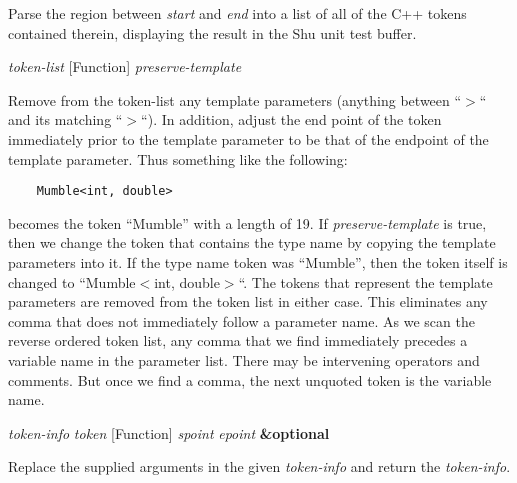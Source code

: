 \begin{doc-string}
Parse the region between \emph{start} and \emph{end} into a list of all of the C++ tokens
contained therein, displaying the result in the Shu unit test buffer.
\end{doc-string}

\vspace{1em}
\noindent
{}
\usebox{\funcname}\emph{token-list}
 \hfill [Function]
\hspace*{\wd\funcname}\emph{preserve-template}

\begin{doc-string}
Remove from the token-list any template parameters (anything between ``$>$``
and its matching ``$>$``).  In addition, adjust the end point of the token
immediately prior to the template parameter to be that of the endpoint of the
template parameter.
Thus something like the following:
\small{\begin{verbatim}
    Mumble<int, double>
\end{verbatim}}
becomes the token ``Mumble'' with a length of 19.  If \emph{preserve-template} is true,
then we change the token that contains the type name by copying the template
parameters into it.  If the type name token was ``Mumble'', then the token
itself is changed to ``Mumble$<$int, double$>$``.  The tokens that represent the
template parameters are removed from the token list in either case.
This eliminates any comma that does not immediately follow a parameter name.
As we scan the reverse ordered token list, any comma that we find immediately
precedes a variable name in the parameter list.  There may be intervening
operators and comments.  But once we find a comma, the next unquoted token is
the variable name.
\end{doc-string}

\vspace{1em}
\noindent
{}
\usebox{\funcname}\emph{token-info} \emph{token}
 \hfill [Function]
\hspace*{\wd\funcname}\emph{spoint} \emph{epoint} \textbf{\&optional}
\hspace*{\wd\funcname}

\begin{doc-string}
Replace the supplied arguments in the given \emph{token-info} and return the \emph{token-info}.
\end{doc-string}

